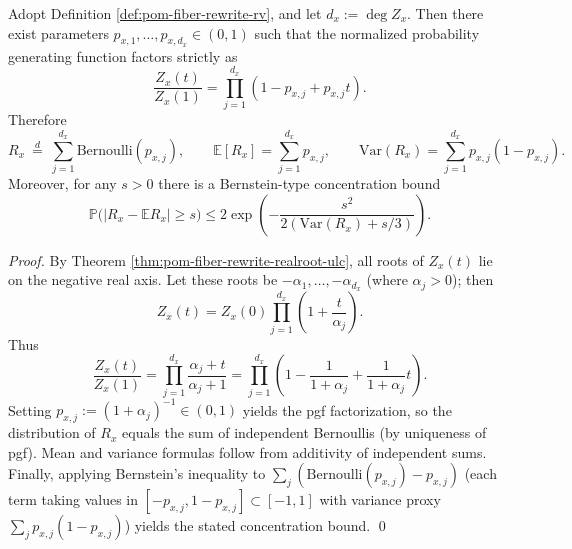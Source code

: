 \begin{corollary}\label{cor:pom-fiber-rewrite-poisson-binomial}
Adopt Definition \ref{def:pom-fiber-rewrite-rv}, and let \(d_x:=\deg Z_x\).
Then there exist parameters \(p_{x,1},\dots,p_{x,d_x}\in(0,1)\) such that the normalized probability generating function factors strictly as
\[
\frac{Z_x(t)}{Z_x(1)}=\prod_{j=1}^{d_x}(1-p_{x,j}+p_{x,j}t).
\]
Therefore
\[
R_x\ \overset{d}{=}\ \sum_{j=1}^{d_x}\mathrm{Bernoulli}(p_{x,j}),
\qquad
\mathbb{E}[R_x]=\sum_{j=1}^{d_x} p_{x,j},
\qquad
\mathrm{Var}(R_x)=\sum_{j=1}^{d_x}p_{x,j}(1-p_{x,j}).
\]
Moreover, for any \(s>0\) there is a Bernstein-type concentration bound
\[
\mathbb{P}\bigl(|R_x-\mathbb{E}R_x|\ge s\bigr)
\le 2\exp\!\left(-\frac{s^2}{2(\mathrm{Var}(R_x)+s/3)}\right).
\]
\end{corollary}
\begin{proof}
By Theorem \ref{thm:pom-fiber-rewrite-realroot-ulc}, all roots of \(Z_x(t)\) lie on the negative real axis.
Let these roots be \(-\alpha_1,\dots,-\alpha_{d_x}\) (where \(\alpha_j>0\)); then
\[
Z_x(t)=Z_x(0)\prod_{j=1}^{d_x}\left(1+\frac{t}{\alpha_j}\right).
\]
Thus
\[
\frac{Z_x(t)}{Z_x(1)}
=\prod_{j=1}^{d_x}\frac{\alpha_j+t}{\alpha_j+1}
=\prod_{j=1}^{d_x}\left(1-\frac{1}{1+\alpha_j}+\frac{1}{1+\alpha_j}t\right).
\]
Setting \(p_{x,j}:=(1+\alpha_j)^{-1}\in(0,1)\) yields the pgf factorization, so the distribution of \(R_x\) equals the sum of independent Bernoullis (by uniqueness of pgf).
Mean and variance formulas follow from additivity of independent sums.
Finally, applying Bernstein's inequality to \(\sum_j(\mathrm{Bernoulli}(p_{x,j})-p_{x,j})\) (each term taking values in \([-p_{x,j},1-p_{x,j}]\subset[-1,1]\) with variance proxy \(\sum_j p_{x,j}(1-p_{x,j})\)) yields the stated concentration bound. \qed
\end{proof}

